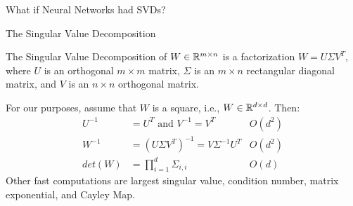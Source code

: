 \begin{frame}[standout]
	What if Neural Networks had SVDs?
\end{frame}

\begin{frame}{The Singular Value Decomposition}
	\begin{definition}
		The Singular Value Decomposition of $W \in \mathbb{R}^{m\times n}$ is a factorization
		$W = U \Sigma V^T$, where  $U$ is an \alert{orthogonal} $m \times m$ matrix,
		$\Sigma$ is an $m \times n$ rectangular diagonal matrix, and $V$ is an $n \times
		n$ \alert{orthogonal} matrix.
	\end{definition}
	For our purposes, assume that $W$ is a square, i.e., $W \in \mathbb{R}^{d\times d}$.
	Then:
	\begin{align*}
		U^{-1} &= U^T\text{ and }V^{-1} = V^T  \quad \quad & O(d^2)\\
		W^{-1} &= (U \Sigma V^T)^{-1} = V \Sigma^{-1} U^T  & O(d^2)\\
		det(W) &= \prod_{i=1}^{d} \Sigma_{i,i}   & O(d)
	\end{align*}
	Other fast computations are largest singular value, condition number, matrix exponential, and Cayley Map.
\end{frame}


